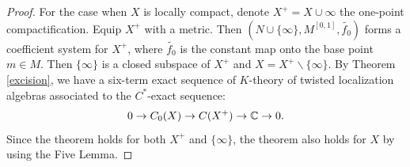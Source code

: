 \documentclass[11pt]{article}
\theoremstyle{definition}
\theoremstyle{plain}
\begin{document}
\begin{appendices}
\begin{proof}
For the case when $X$ is locally compact, denote $X^+=X\cup\infty$ the one-point compactification. Equip $X^+$ with a metric. Then $(N\cup\{\infty\},M^{[0,1]},\widetilde{f_0})$ forms a coefficient system for $X^+$, where $\widetilde{f_0}$ is the constant map onto the base point $m\in M$. Then $\{\infty\}$ is a closed subspace of $X^+$ and $X=X^+\backslash\{\infty\}$. By Theorem \ref{excision}, we have a six-term exact sequence of $K$-theory of twisted localization algebras associated to the $C^*$-exact sequence:
$$0\to C_0(X)\to C(X^+)\to \mathbb C\to 0.$$
Since the theorem holds for both $X^+$ and $\{\infty\}$, the theorem also holds for $X$ by using the Five Lemma.
\end{proof}













































































































\end{appendices}
\end{document}
